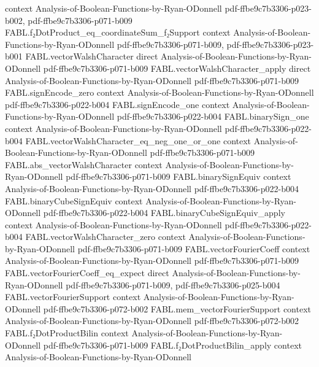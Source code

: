 \begin{theorem}
  {context}
  {Analysis-of-Boolean-Functions-by-Ryan-ODonnell}
  {pdf-ffbe9c7b3306-p023-b002,
    pdf-ffbe9c7b3306-p071-b009}
\proofstep
  {FABL.f₂DotProduct_eq_coordinateSum_f₂Support}
  {context}
  {Analysis-of-Boolean-Functions-by-Ryan-ODonnell}
  {pdf-ffbe9c7b3306-p071-b009,
    pdf-ffbe9c7b3306-p023-b001}
\proofstep
  {FABL.vectorWalshCharacter}
  {direct}
  {Analysis-of-Boolean-Functions-by-Ryan-ODonnell}
  {pdf-ffbe9c7b3306-p071-b009}
\proofstep
  {FABL.vectorWalshCharacter_apply}
  {direct}
  {Analysis-of-Boolean-Functions-by-Ryan-ODonnell}
  {pdf-ffbe9c7b3306-p071-b009}
\proofstep
  {FABL.signEncode_zero}
  {context}
  {Analysis-of-Boolean-Functions-by-Ryan-ODonnell}
  {pdf-ffbe9c7b3306-p022-b004}
\proofstep
  {FABL.signEncode_one}
  {context}
  {Analysis-of-Boolean-Functions-by-Ryan-ODonnell}
  {pdf-ffbe9c7b3306-p022-b004}
\proofstep
  {FABL.binarySign_one}
  {context}
  {Analysis-of-Boolean-Functions-by-Ryan-ODonnell}
  {pdf-ffbe9c7b3306-p022-b004}
\proofstep
  {FABL.vectorWalshCharacter_eq_neg_one_or_one}
  {context}
  {Analysis-of-Boolean-Functions-by-Ryan-ODonnell}
  {pdf-ffbe9c7b3306-p071-b009}
\proofstep
  {FABL.abs_vectorWalshCharacter}
  {context}
  {Analysis-of-Boolean-Functions-by-Ryan-ODonnell}
  {pdf-ffbe9c7b3306-p071-b009}
\proofstep
  {FABL.binarySignEquiv}
  {context}
  {Analysis-of-Boolean-Functions-by-Ryan-ODonnell}
  {pdf-ffbe9c7b3306-p022-b004}
\proofstep
  {FABL.binaryCubeSignEquiv}
  {context}
  {Analysis-of-Boolean-Functions-by-Ryan-ODonnell}
  {pdf-ffbe9c7b3306-p022-b004}
\proofstep
  {FABL.binaryCubeSignEquiv_apply}
  {context}
  {Analysis-of-Boolean-Functions-by-Ryan-ODonnell}
  {pdf-ffbe9c7b3306-p022-b004}
\proofstep
  {FABL.vectorWalshCharacter_zero}
  {context}
  {Analysis-of-Boolean-Functions-by-Ryan-ODonnell}
  {pdf-ffbe9c7b3306-p071-b009}
\proofstep
  {FABL.vectorFourierCoeff}
  {context}
  {Analysis-of-Boolean-Functions-by-Ryan-ODonnell}
  {pdf-ffbe9c7b3306-p071-b009}
\proofstep
  {FABL.vectorFourierCoeff_eq_expect}
  {direct}
  {Analysis-of-Boolean-Functions-by-Ryan-ODonnell}
  {pdf-ffbe9c7b3306-p071-b009,
    pdf-ffbe9c7b3306-p025-b004}
\proofstep
  {FABL.vectorFourierSupport}
  {context}
  {Analysis-of-Boolean-Functions-by-Ryan-ODonnell}
  {pdf-ffbe9c7b3306-p072-b002}
\proofstep
  {FABL.mem_vectorFourierSupport}
  {context}
  {Analysis-of-Boolean-Functions-by-Ryan-ODonnell}
  {pdf-ffbe9c7b3306-p072-b002}
\proofstep
  {FABL.f₂DotProductBilin}
  {context}
  {Analysis-of-Boolean-Functions-by-Ryan-ODonnell}
  {pdf-ffbe9c7b3306-p071-b009}
\proofstep
  {FABL.f₂DotProductBilin_apply}
  {context}
  {Analysis-of-Boolean-Functions-by-Ryan-ODonnell}

\end{theorem}
